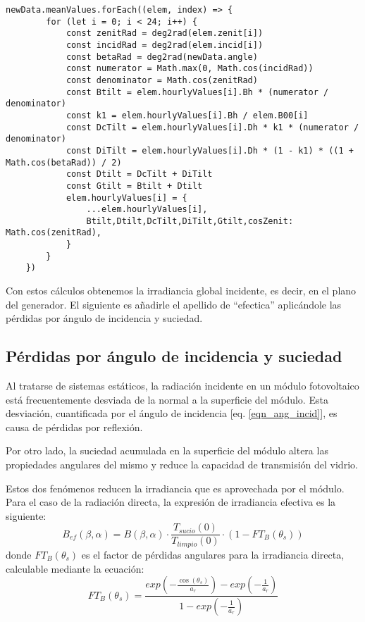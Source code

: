 \begin{lstlisting}[style=ES6, caption={Cálculo del ángulo de incidencia}]
newData.meanValues.forEach((elem, index) => {
		for (let i = 0; i < 24; i++) {
			const zenitRad = deg2rad(elem.zenit[i])
			const incidRad = deg2rad(elem.incid[i])
			const betaRad = deg2rad(newData.angle)
			const numerator = Math.max(0, Math.cos(incidRad))
			const denominator = Math.cos(zenitRad)
			const Btilt = elem.hourlyValues[i].Bh * (numerator / denominator)
			const k1 = elem.hourlyValues[i].Bh / elem.B00[i]
			const DcTilt = elem.hourlyValues[i].Dh * k1 * (numerator / denominator)
			const DiTilt = elem.hourlyValues[i].Dh * (1 - k1) * ((1 + Math.cos(betaRad)) / 2)
			const Dtilt = DcTilt + DiTilt
			const Gtilt = Btilt + Dtilt
			elem.hourlyValues[i] = {
				...elem.hourlyValues[i],
				Btilt,Dtilt,DcTilt,DiTilt,Gtilt,cosZenit: Math.cos(zenitRad),
			}
		}
	})
\end{lstlisting}

Con estos cálculos obtenemos la irradiancia global incidente, es decir, en el plano del generador. El siguiente es añadirle el apellido de ``efectica'' aplicándole las pérdidas por ángulo de incidencia y suciedad.

\subsection{Pérdidas por ángulo de incidencia y suciedad}

Al tratarse de sistemas estáticos, la radiación incidente en un módulo fotovoltaico está frecuentemente desviada de la normal a la superficie del módulo. Esta desviación, cuantificada por el ángulo de incidencia [eq. \ref{eqn_ang_incid}], es causa de pérdidas por reflexión.

Por otro lado, la suciedad acumulada en la superficie del módulo altera las propiedades angulares del mismo y reduce la capacidad de transmisión del vidrio.

Estos dos fenómenos reducen la irradiancia que es aprovechada por el módulo. Para el caso de la radiación directa, la expresión de irradiancia efectiva es la siguiente:
\begin{equation}
B_{ef}(\beta, \alpha)= B(\beta,\alpha)\cdot\frac{T_{sucio}(0)}{T_{limpio}(0)}\cdot(1-FT_B(\theta_s))
\end{equation}
donde $FT_B(\theta_s)$ es el factor de pérdidas angulares para la irradiancia directa, calculable mediante la ecuación:
\begin{equation}
FT_B(\theta_s) = \frac{exp(-\frac{\cos(\theta_s)}{a_r})-exp(-\frac{1}{a_r})}{1-exp(-\frac{1}{a_r})}
\end{equation}

